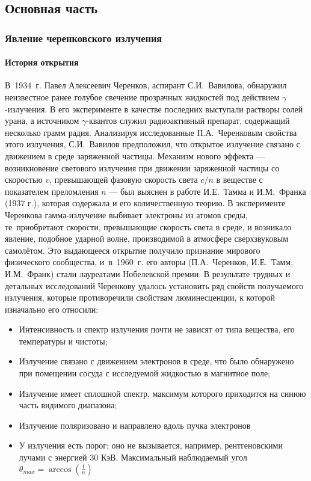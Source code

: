 \begin{Diplom-Main}
	\def\dd#1#2{\frac{d#1}{d#2}}
	\fontsize{16}{14pt}\selectfont
	\part{Основная часть}	
	\label{sec:part}
	
	\section{Явление черенковского излучения}
	\label{sec:section}
	
	\subsection{История открытия}
	\label{sec:subsection}
	В~1934~г. Павел Алексеевич Черенков, аспирант С.И.~Вавилова, обнаружил неизвестное ранее голубое свечение прозрачных жидкостей под действием $\gamma$-излучения. 
	В его эксперименте в качестве последних выступали растворы солей урана, а источником $\gamma$-квантов служил радиоактивный препарат, содержащий несколько грамм радия.
	 Анализируя исследованные П.А.~Черенковым свойства этого излучения, С.И.~Вавилов предположил, что открытое излучение связано с движением в среде заряженной частицы. 
	 Механизм нового эффекта --- возникновение светового излучения при движении заряженной частицы со скоростью $v$, превышающей фазовую скорость света $c/n$ в веществе с показателем преломления $n$ --- был выяснен в работе И.Е.~Тамма и И.М.~Франка (1937 г.), которая содержала и его количественную теорию.
	 В эксперименте Черенкова гамма-излучение выбивает электроны из атомов среды, те~приобретают скорости, превышающие скорость света в среде, и возникало явление, подобное ударной волне, производимой в атмосфере сверхзвуковым самолётом.
	 Это выдающееся открытие получило признание мирового физического сообщества, и~в~1960~г. его авторы (П.А.~Черенков, И.Е.~Тамм, И.М.~Франк) стали лауреатами Нобелевской премии.
	 В результате трудных и детальных исследований Черенкову удалось установить ряд свойств получаемого излучения, которые противоречили свойствам люминесценции, к которой изначально его относили:
	 \begin{itemize}
	 	\item Интенсивность и спектр излучения почти не зависят от типа вещества, его температуры и чистоты;
	 	\item Излучение связано с движением электронов в среде, что было обнаружено при помещении сосуда с исследуемой жидкостью в магнитное поле;
	 	\item Излучение имеет сплошной спектр, максимум которого приходится на синюю часть видимого диапазона;
	 	\item Излучение поляризовано и направлено вдоль пучка электронов
	 	\item У излучения есть порог; оно не вызывается, например, рентгеновскими лучами с энергией 30 КэВ. Максимальный наблюдаемый угол $ \theta_{max} = \arccos(\frac{1}{n}) $
	 \end{itemize}
	 

\end{Diplom-Main}
